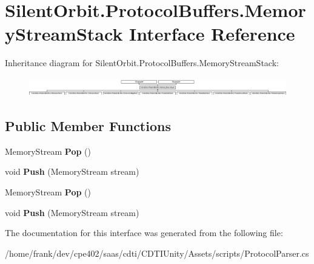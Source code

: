 \hypertarget{interface_silent_orbit_1_1_protocol_buffers_1_1_memory_stream_stack}{}\section{Silent\+Orbit.\+Protocol\+Buffers.\+Memory\+Stream\+Stack Interface Reference}
\label{interface_silent_orbit_1_1_protocol_buffers_1_1_memory_stream_stack}
Inheritance diagram for Silent\+Orbit.\+Protocol\+Buffers.\+Memory\+Stream\+Stack\+:\begin{figure}[H]
\begin{center}
\leavevmode
\includegraphics[height=0.821918cm]{interface_silent_orbit_1_1_protocol_buffers_1_1_memory_stream_stack}
\end{center}
\end{figure}
\subsection*{Public Member Functions}
\begin{DoxyCompactItemize}
\item 
\hypertarget{interface_silent_orbit_1_1_protocol_buffers_1_1_memory_stream_stack_a7408e30789e2d7ee77cd166e69b98a48}{}Memory\+Stream {\bfseries Pop} ()\label{interface_silent_orbit_1_1_protocol_buffers_1_1_memory_stream_stack_a7408e30789e2d7ee77cd166e69b98a48}

\item 
\hypertarget{interface_silent_orbit_1_1_protocol_buffers_1_1_memory_stream_stack_a1ae64da82a0acdfaaec81a0697d3c070}{}void {\bfseries Push} (Memory\+Stream stream)\label{interface_silent_orbit_1_1_protocol_buffers_1_1_memory_stream_stack_a1ae64da82a0acdfaaec81a0697d3c070}

\item 
\hypertarget{interface_silent_orbit_1_1_protocol_buffers_1_1_memory_stream_stack_a7408e30789e2d7ee77cd166e69b98a48}{}Memory\+Stream {\bfseries Pop} ()\label{interface_silent_orbit_1_1_protocol_buffers_1_1_memory_stream_stack_a7408e30789e2d7ee77cd166e69b98a48}

\item 
\hypertarget{interface_silent_orbit_1_1_protocol_buffers_1_1_memory_stream_stack_a1ae64da82a0acdfaaec81a0697d3c070}{}void {\bfseries Push} (Memory\+Stream stream)\label{interface_silent_orbit_1_1_protocol_buffers_1_1_memory_stream_stack_a1ae64da82a0acdfaaec81a0697d3c070}

\end{DoxyCompactItemize}


The documentation for this interface was generated from the following file\+:\begin{DoxyCompactItemize}
\item 
/home/frank/dev/cpe402/saas/cdti/\+C\+D\+T\+I\+Unity/\+Assets/scripts/Protocol\+Parser.\+cs\end{DoxyCompactItemize}
